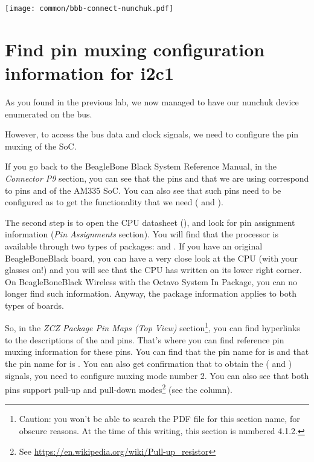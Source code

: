 \begin{center}
\texttt{[image: common/bbb-connect-nunchuk.pdf]}
\end{center}

\section{Find pin muxing configuration information for i2c1}

As you found in the previous lab, we now managed to have our nunchuk
device enumerated on the  bus.

However, to access the bus data and clock signals, we need to configure
the pin muxing of the SoC.

If you go back to the BeagleBone Black System Reference Manual, in the
{\em Connector P9} section, you can see that the pins  and
 that we are using correspond to pins  and 
of the AM335 SoC. You can also see that such pins need to be configured
as  to get the functionality that we need (
and ).

The second step is to open the CPU datasheet (), and
look for pin assignment information ({\em Pin Assignments} section).
You will find that the processor is available through two types of
packages:  and . If you have an original
BeagleBoneBlack board, you can have a very close look at the CPU
(with your glasses on!) and you will see that the CPU has  written
on its lower right corner. On BeagleBoneBlack Wireless with the
Octavo System In Package, you can no longer find such information.
Anyway, the  package information applies to both types of
boards.

So, in the {\em ZCZ Package Pin Maps (Top View)} section\footnote{Caution: you
won't be able to search the PDF file for this section name, for obscure
reasons. At the time of this writing, this section is numbered 4.1.2.}, you can find
hyperlinks to the descriptions of the  and  pins.
That's where you can find reference pin muxing information for these
pins.  You can find that the pin name for  is 
and that the pin name for  is .
You can also get confirmation that to obtain the ( and
) signals, you need to configure muxing mode number 2.
You can also see that both pins support pull-up and pull-down
modes\footnote{See \url{https://en.wikipedia.org/wiki/Pull-up_resistor}}
(see the  column).

